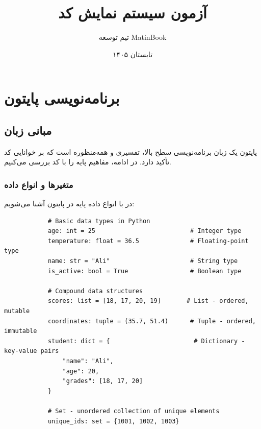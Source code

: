 \documentclass{matinbook}
\title{آزمون سیستم نمایش کد}
\author{تیم توسعه MatinBook}
\date{تابستان ۱۴۰۵}
\begin{document}
    
    \maketitle
    
    \chapter{برنامه‌نویسی پایتون}
    
    \section{مبانی زبان}
    
    پایتون یک زبان برنامه‌نویسی سطح بالا،
    تفسیری و همه‌منظوره است که بر خوانایی کد تأکید دارد.
    در ادامه، مفاهیم پایه را با کد بررسی می‌کنیم.
    
    \subsection{متغیرها و انواع داده}
    
    در  با انواع داده پایه در پایتون
    آشنا می‌شویم:
    
    \begin{latin}
        \begin{verbatim}
            # Basic data types in Python
            age: int = 25                          # Integer type
            temperature: float = 36.5              # Floating-point type
            name: str = "Ali"                      # String type
            is_active: bool = True                 # Boolean type
            
            # Compound data structures
            scores: list = [18, 17, 20, 19]       # List - ordered, mutable
            coordinates: tuple = (35.7, 51.4)      # Tuple - ordered, immutable
            student: dict = {                       # Dictionary - key-value pairs
                "name": "Ali",
                "age": 20,
                "grades": [18, 17, 20]
            }
            
            # Set - unordered collection of unique elements
            unique_ids: set = {1001, 1002, 1003}
        \end{verbatim}
    \end{latin}
    \label{code:variables}
    
\end{document}
